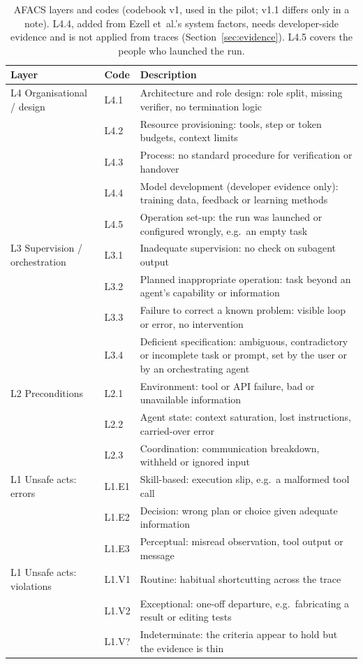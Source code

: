 \documentclass[10pt]{article}
\begin{document}
\begin{table}[tbp]
\centering
\caption{AFACS layers and codes (codebook v1, used in the pilot; v1.1 differs only in a note). L4.4, added from Ezell et~al.'s
system factors, needs developer-side evidence and is not applied from traces
(Section~\ref{sec:evidence}). L4.5 covers the people who launched the run.}
\label{tab:codes}
\small
\begin{tabular}{@{}L{3.3cm}lL{9.6cm}@{}}
\toprule
Layer & Code & Description\\
\midrule
L4 Organisational / design & L4.1 & Architecture and role design: role split, missing verifier, no termination logic\\
 & L4.2 & Resource provisioning: tools, step or token budgets, context limits\\
 & L4.3 & Process: no standard procedure for verification or handover\\
 & L4.4 & Model development (developer evidence only): training data, feedback or learning methods\\
 & L4.5 & Operation set-up: the run was launched or configured wrongly, e.g.\ an empty task\\
\midrule
L3 Supervision / orchestration & L3.1 & Inadequate supervision: no check on subagent output\\
 & L3.2 & Planned inappropriate operation: task beyond an agent's capability or information\\
 & L3.3 & Failure to correct a known problem: visible loop or error, no intervention\\
 & L3.4 & Deficient specification: ambiguous, contradictory or incomplete task or prompt, set by the user or by an orchestrating agent\\
\midrule
L2 Preconditions & L2.1 & Environment: tool or API failure, bad or unavailable information\\
 & L2.2 & Agent state: context saturation, lost instructions, carried-over error\\
 & L2.3 & Coordination: communication breakdown, withheld or ignored input\\
\midrule
L1 Unsafe acts: errors & L1.E1 & Skill-based: execution slip, e.g.\ a malformed tool call\\
 & L1.E2 & Decision: wrong plan or choice given adequate information\\
 & L1.E3 & Perceptual: misread observation, tool output or message\\
L1 Unsafe acts: violations & L1.V1 & Routine: habitual shortcutting across the trace\\
 & L1.V2 & Exceptional: one-off departure, e.g.\ fabricating a result or editing tests\\
 & L1.V? & Indeterminate: the criteria appear to hold but the evidence is thin\\
\bottomrule
\end{tabular}
\end{table}
\end{document}
